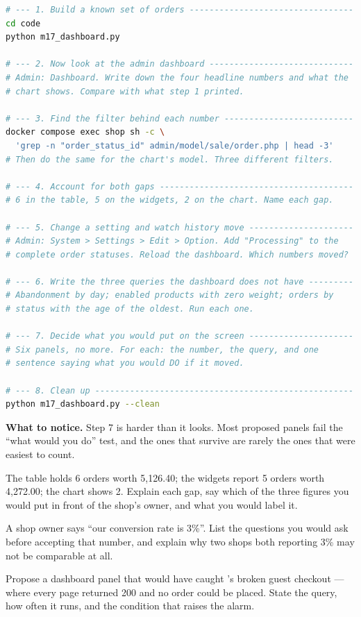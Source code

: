 \begin{lab}
\begin{lstlisting}[language=bash]
# --- 1. Build a known set of orders ---------------------------------
cd code
python m17_dashboard.py

# --- 2. Now look at the admin dashboard -----------------------------
# Admin: Dashboard. Write down the four headline numbers and what the
# chart shows. Compare with what step 1 printed.

# --- 3. Find the filter behind each number --------------------------
docker compose exec shop sh -c \
  'grep -n "order_status_id" admin/model/sale/order.php | head -3'
# Then do the same for the chart's model. Three different filters.

# --- 4. Account for both gaps ---------------------------------------
# 6 in the table, 5 on the widgets, 2 on the chart. Name each gap.

# --- 5. Change a setting and watch history move ---------------------
# Admin: System > Settings > Edit > Option. Add "Processing" to the
# complete order statuses. Reload the dashboard. Which numbers moved?

# --- 6. Write the three queries the dashboard does not have ---------
# Abandonment by day; enabled products with zero weight; orders by
# status with the age of the oldest. Run each one.

# --- 7. Decide what you would put on the screen ---------------------
# Six panels, no more. For each: the number, the query, and one
# sentence saying what you would DO if it moved.

# --- 8. Clean up ----------------------------------------------------
python m17_dashboard.py --clean
\end{lstlisting}

\smallskip
\textbf{What to notice.} Step 7 is harder than it looks. Most proposed panels
fail the ``what would you do'' test, and the ones that survive are rarely the
ones that were easiest to count.
\end{lab}

\begin{checkpoint}
\begin{tightnum}
  \item The table holds 6 orders worth 5{,}126.40; the widgets report 5 orders
        worth 4{,}272.00; the chart shows 2. Explain each gap, say which of the
        three figures you would put in front of the shop's owner, and what you
        would label it.
  \item A shop owner says ``our conversion rate is 3\%''. List the questions you
        would ask before accepting that number, and explain why two shops both
        reporting 3\% may not be comparable at all.
  \item Propose a dashboard panel that would have caught 's
        broken guest checkout --- where every page returned 200 and no order
        could be placed. State the query, how often it runs, and the condition
        that raises the alarm.
\end{tightnum}
\end{checkpoint}

